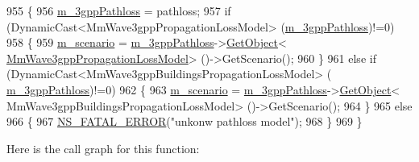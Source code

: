 \begin{DoxyCode}
955 \{
956         \hyperlink{classns3_1_1MmWave3gppChannel_add8860051acacb1819be2f7321dbd726}{m\_3gppPathloss} = pathloss;
957         \textcolor{keywordflow}{if} (DynamicCast<MmWave3gppPropagationLossModel> (\hyperlink{classns3_1_1MmWave3gppChannel_add8860051acacb1819be2f7321dbd726}{m\_3gppPathloss})!=0)
958         \{
959                 \hyperlink{classns3_1_1MmWave3gppChannel_ae1f263fbc87682905d563221343e4447}{m\_scenario} = \hyperlink{classns3_1_1MmWave3gppChannel_add8860051acacb1819be2f7321dbd726}{m\_3gppPathloss}->\hyperlink{classns3_1_1Object_a13e18c00017096c8381eb651d5bd0783}{GetObject}<
      \hyperlink{classMmWave3gppPropagationLossModel}{MmWave3gppPropagationLossModel}> ()->GetScenario();
960         \}
961         \textcolor{keywordflow}{else} \textcolor{keywordflow}{if} (DynamicCast<MmWave3gppBuildingsPropagationLossModel> (
      \hyperlink{classns3_1_1MmWave3gppChannel_add8860051acacb1819be2f7321dbd726}{m\_3gppPathloss})!=0)
962         \{
963                 \hyperlink{classns3_1_1MmWave3gppChannel_ae1f263fbc87682905d563221343e4447}{m\_scenario} = \hyperlink{classns3_1_1MmWave3gppChannel_add8860051acacb1819be2f7321dbd726}{m\_3gppPathloss}->\hyperlink{classns3_1_1Object_a13e18c00017096c8381eb651d5bd0783}{GetObject}<
      MmWave3gppBuildingsPropagationLossModel> ()->GetScenario();
964         \}
965         \textcolor{keywordflow}{else}
966         \{
967                 \hyperlink{group__fatal_ga5131d5e3f75d7d4cbfd706ac456fdc85}{NS\_FATAL\_ERROR}(\textcolor{stringliteral}{"unkonw pathloss model"});
968         \}
969 \}
\end{DoxyCode}


Here is the call graph for this function\+:


